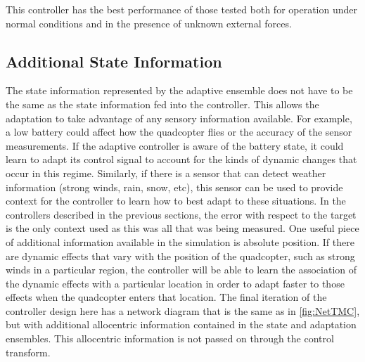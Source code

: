 \documentclass[letterpaper,12pt,titlepage,oneside,final]{book}
\begin{document}
This controller has the best performance of those tested both for operation under normal conditions and in the presence of unknown external forces.

\subsection{Additional State Information}

The state information represented by the adaptive ensemble does not have to be the same as the state information fed into the controller.
This allows the adaptation to take advantage of any sensory information available.
For example, a low battery could affect how the quadcopter flies or the accuracy of the sensor measurements. If the adaptive controller is aware of the battery state, it could learn to adapt its control signal to account for the kinds of dynamic changes that occur in this regime.
Similarly, if there is a sensor that can detect weather information (strong winds, rain, snow, etc), this sensor can be used to provide context for the controller to learn how to best adapt to these situations.
In the controllers described in the previous sections, the error with respect to the target is the only context used as this was all that was being measured.
One useful piece of additional information available in the simulation is absolute position.
If there are dynamic effects that vary with the position of the quadcopter, such as strong winds in a particular region, the controller will be able to learn the association of the dynamic effects with a particular location in order to adapt faster to those effects when the quadcopter enters that location.
The final iteration of the controller design here has a network diagram that is the same as in \autoref{fig:NetTMC}, but with additional allocentric information contained in the state and adaptation ensembles. This allocentric information is not passed on through the control transform.


\end{document}
